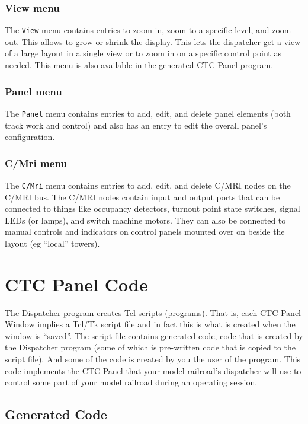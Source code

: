 \subsubsection{View menu}

The \verb=View= menu contains entries to zoom in, zoom to a specific
level, and zoom out. This allows to grow or shrink the display.  This
lets the dispatcher get a view of a large layout in a single view or to
zoom in on a specific control point as needed.  This menu is also
available in the generated CTC Panel program.

\subsubsection{Panel menu}

The \verb=Panel= menu contains entries to add, edit, and delete panel
elements (both track work and control) and also has an entry to edit the
overall panel's configuration. 

\subsubsection{C/Mri menu}

The \verb=C/Mri= menu contains entries to add, edit, and delete C/MRI
nodes on the C/MRI bus. The C/MRI nodes contain input and output ports
that can be connected to things like occupancy detectors, turnout point
state switches, signal LEDs (or lamps), and switch machine motors.  They
can also be connected to manual controls and indicators on control
panels mounted over on beside the layout (eg ``local'' towers).


\section{CTC Panel Code}

The Dispatcher program creates Tcl scripts (programs).  That is, each
CTC Panel Window implies a Tcl/Tk script file and in fact this is what
is created when the window is ``saved''.  The script file contains
generated code, code that is created by the Dispatcher program (some of
which is pre-written code that is copied to the script file). And some
of the code is created by you the user of the program. This code
implements the CTC Panel that your model railroad's dispatcher will use
to control some part of your model railroad during an operating session.

\subsection{Generated Code}

